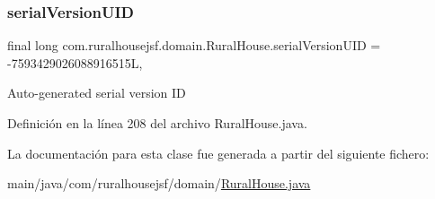 \subsubsection{\texorpdfstring{serialVersionUID}{serialVersionUID}}
{\footnotesize\ttfamily final long com.\+ruralhousejsf.\+domain.\+Rural\+House.\+serial\+Version\+U\+ID = -\/7593429026088916515L\hspace{0.3cm}{\ttfamily [static]}, {\ttfamily [private]}}

Auto-\/generated serial version ID 

Definición en la línea 208 del archivo Rural\+House.\+java.



La documentación para esta clase fue generada a partir del siguiente fichero\+:\begin{DoxyCompactItemize}
\item 
main/java/com/ruralhousejsf/domain/\mbox{\hyperlink{_rural_house_8java}{Rural\+House.\+java}}\end{DoxyCompactItemize}
